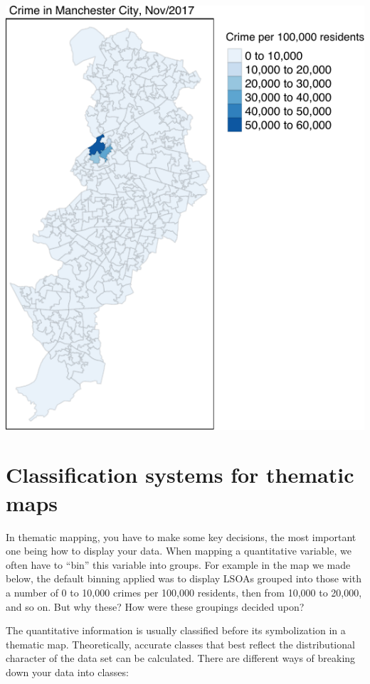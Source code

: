 \documentclass[
]{book}
\begin{document}
\includegraphics{crime_mapping_files/figure-latex/unnamed-chunk-89-1.pdf}

\hypertarget{classification-systems-for-thematic-maps}{%
\section{Classification systems for thematic maps}\label{classification-systems-for-thematic-maps}}

In thematic mapping, you have to make some key decisions, the most important one being how to display your data. When mapping a quantitative variable, we often have to ``bin'' this variable into groups. For example in the map we made below, the default binning applied was to display LSOAs grouped into those with a number of 0 to 10,000 crimes per 100,000 residents, then from 10,000 to 20,000, and so on. But why these? How were these groupings decided upon?

The quantitative information is usually classified before its symbolization in a thematic map. Theoretically, accurate classes that best reflect the distributional character of the data set can be calculated. There are different ways of breaking down your data into classes:
\end{document}

